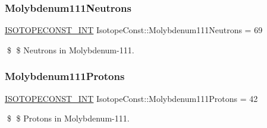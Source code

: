 \subsubsection{\texorpdfstring{Molybdenum111\+Neutrons}{Molybdenum111Neutrons}}
{\footnotesize\ttfamily \mbox{\hyperlink{group___isotope_const-_macros_ga5f18360b3e99483a35c32d789e62621c}{I\+S\+O\+T\+O\+P\+E\+C\+O\+N\+S\+T\+\_\+\+I\+NT}} Isotope\+Const\+::\+Molybdenum111\+Neutrons = 69}

\$ \$ Neutrons in Molybdenum-\/111. \mbox{\label{group___isotope_const-_molybdenum-_mo111_ga3678db9eda71b0d76e6f22a7eed8b796}} 
\subsubsection{\texorpdfstring{Molybdenum111\+Protons}{Molybdenum111Protons}}
{\footnotesize\ttfamily \mbox{\hyperlink{group___isotope_const-_macros_ga5f18360b3e99483a35c32d789e62621c}{I\+S\+O\+T\+O\+P\+E\+C\+O\+N\+S\+T\+\_\+\+I\+NT}} Isotope\+Const\+::\+Molybdenum111\+Protons = 42}

\$ \$ Protons in Molybdenum-\/111. 